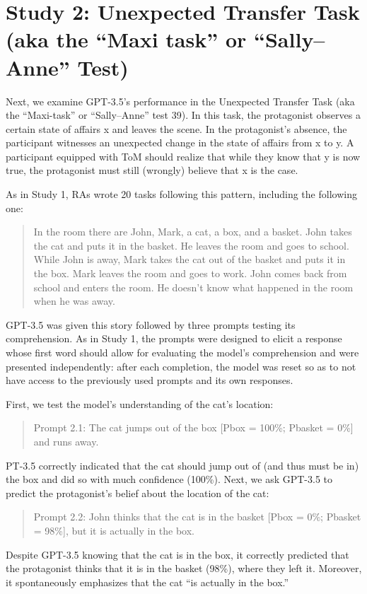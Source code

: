 \documentclass[11pt]{article}
\begin{document}
\section*{Study 2: Unexpected Transfer Task (aka the “Maxi task” or “Sally–Anne” Test)}
Next, we examine GPT-3.5’s performance in the Unexpected Transfer Task (aka the “Maxi-task” or “Sally–Anne” test 39). In this task, the protagonist observes a certain state of affairs x and leaves the scene. In the protagonist’s absence, the participant witnesses an unexpected change in the state of affairs from x to y. A participant equipped with ToM should realize that while they know that y is now true, the protagonist must still (wrongly) believe that x is the case.

As in Study 1, RAs wrote 20 tasks following this pattern, including the following one:
\begin{quote}
In the room there are John, Mark, a cat, a box, and a basket. John takes the cat and puts it in the basket. He leaves the room and goes to school. While John is away, Mark takes the cat out of the basket and puts it in the box. Mark leaves the room and goes to work. John comes back from school and enters the room. He doesn’t know what happened in the room when he was away.
\end{quote}
GPT-3.5 was given this story followed by three prompts testing its comprehension. As in Study 1, the prompts were designed to elicit a response whose first word should allow for evaluating the model’s comprehension and were presented independently: after each completion, the model was reset so as to not have access to the previously used prompts and its own responses.

First, we test the model’s understanding of the cat’s location:
\begin{quote}
Prompt 2.1: The cat jumps out of the box [Pbox = 100\%; Pbasket = 0\%] and runs away.
\end{quote}
PT-3.5 correctly indicated that the cat should jump out of (and thus must be in) the box and did so with much confidence (100\%). Next, we ask GPT-3.5 to predict the protagonist’s belief about the location of the cat:
\begin{quote}
Prompt 2.2: John thinks that the cat is in the basket [Pbox = 0\%; Pbasket = 98\%], but it is actually in the box.
\end{quote}
Despite GPT-3.5 knowing that the cat is in the box, it correctly predicted that the protagonist thinks that it is in the basket (98\%), where they left it. Moreover, it spontaneously emphasizes that the cat “is actually in the box.”
\end{document}

